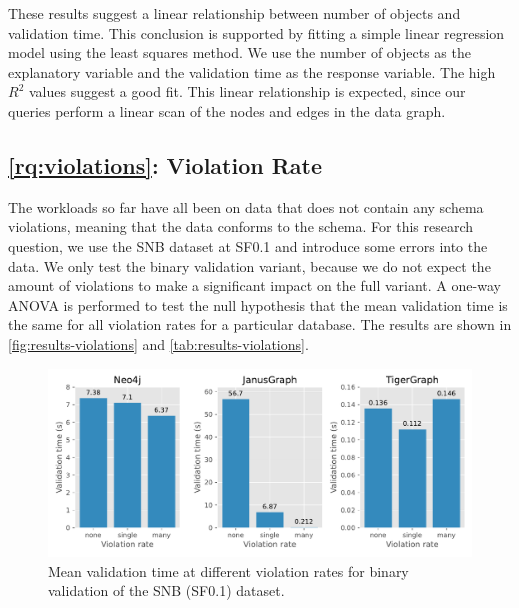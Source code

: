 \documentclass{report}
\theoremstyle{definition}
\begin{document}
These results suggest a linear relationship between number of objects and validation time. This conclusion is supported by fitting a simple linear regression model using the least squares method. We use the number of objects as the explanatory variable and the validation time as the response variable. The high $R^2$ values suggest a good fit. This linear relationship is expected, since our queries perform a linear scan of the nodes and edges in the data graph.

\subsection{\ref*{rq:violations}: Violation Rate}

The workloads so far have all been on data that does not contain any schema violations, meaning that the data conforms to the schema. For this research question, we use the SNB dataset at SF0.1 and introduce some errors into the data. We only test the binary validation variant, because we do not expect the amount of violations to make a significant impact on the full variant. A one-way ANOVA is performed to test the null hypothesis that the mean validation time is the same for all violation rates for a particular database. The results are shown in \autoref{fig:results-violations} and \autoref{tab:results-violations}.

\begin{figure}[t]
  \centering
  \includegraphics[scale=0.5]{figures/results-violations.pdf}
  \caption[Mean validation time at different violation rates]{Mean validation time at different violation rates for binary validation of the SNB (SF0.1) dataset.}
  \label{fig:results-violations}
\end{figure}
\end{document}
